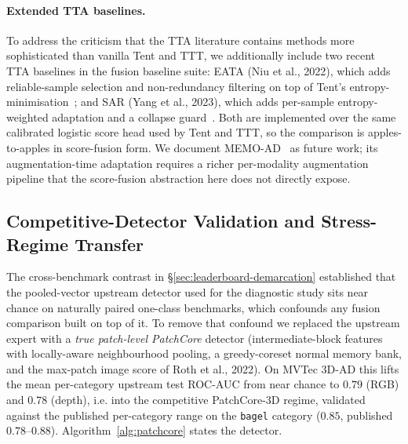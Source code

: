 \documentclass[10pt,conference]{IEEEtran}
\begin{document}
\paragraph{Extended TTA baselines.} To address the criticism that the
TTA literature contains methods more sophisticated than vanilla Tent
and TTT, we additionally include two recent TTA baselines in the
fusion baseline suite: EATA (Niu et al., 2022), which adds
reliable-sample selection and non-redundancy filtering on top of
Tent's entropy-minimisation~\cite{niu2022efficient}; and
SAR (Yang et al., 2023), which adds per-sample entropy-weighted
adaptation and a collapse guard~\cite{yang2023sar}. Both are
implemented over the same calibrated logistic score head used by Tent
and TTT, so the comparison is apples-to-apples in score-fusion form.
We document MEMO-AD~\cite{zhang2022memo} as future work; its
augmentation-time adaptation requires a richer per-modality
augmentation pipeline that the score-fusion abstraction here does
not directly expose.

\subsection{Competitive-Detector Validation and Stress-Regime Transfer}
\label{sec:v3-strong-detector}

The cross-benchmark contrast in \S\ref{sec:leaderboard-demarcation}
established that the pooled-vector upstream detector used for the
diagnostic study sits near chance on naturally paired one-class
benchmarks, which confounds any fusion comparison built on top of it.
To remove that confound we replaced the upstream expert with a
\emph{true patch-level PatchCore} detector (intermediate-block features
with locally-aware neighbourhood pooling, a greedy-coreset normal memory
bank, and the max-patch image score of Roth et al., 2022). On MVTec
3D-AD this lifts the mean per-category upstream test ROC-AUC from near
chance to $0.79$ (RGB) and $0.78$ (depth), i.e. into the competitive
PatchCore-3D regime, validated against the published per-category range
on the \texttt{bagel} category ($0.85$, published $0.78$--$0.88$).
Algorithm~\ref{alg:patchcore} states the detector.
\end{document}
